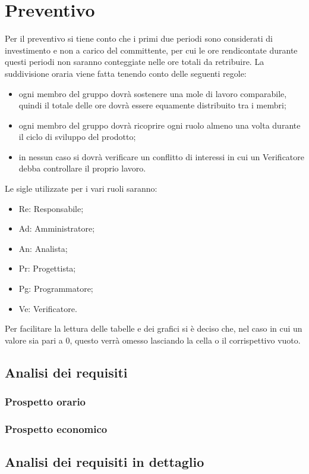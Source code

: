 \newpage
\section{Preventivo}

Per il preventivo si tiene conto che i primi due periodi sono considerati di investimento e non a carico del committente, per cui le ore rendicontate durante questi periodi non saranno conteggiate nelle ore totali da retribuire.
La suddivisione oraria viene fatta tenendo conto delle seguenti regole:
\begin{itemize}
	\item ogni membro del gruppo dovrà sostenere una mole di lavoro comparabile, quindi il totale delle ore dovrà essere equamente distribuito tra i membri;
	\item ogni membro del gruppo dovrà ricoprire ogni ruolo almeno una volta durante il ciclo di sviluppo del prodotto;
	\item in nessun caso si dovrà verificare un conflitto di interessi in cui un Verificatore debba	controllare il proprio lavoro.
\end{itemize}
Le sigle utilizzate per i vari ruoli saranno:
\begin{itemize}
	\item Re: Responsabile;
	\item Ad: Amministratore;
	\item An: Analista;
	\item Pr: Progettista;
	\item Pg: Programmatore;
	\item Ve: Verificatore.
\end{itemize}
Per facilitare la lettura delle tabelle e dei grafici si è deciso che, nel caso in cui un valore sia pari a 0, questo verrà omesso lasciando la cella o il corrispettivo vuoto.

\subsection{Analisi dei requisiti}
\subsubsection{Prospetto orario}
\subsubsection{Prospetto economico}

\subsection{Analisi dei requisiti in dettaglio}
